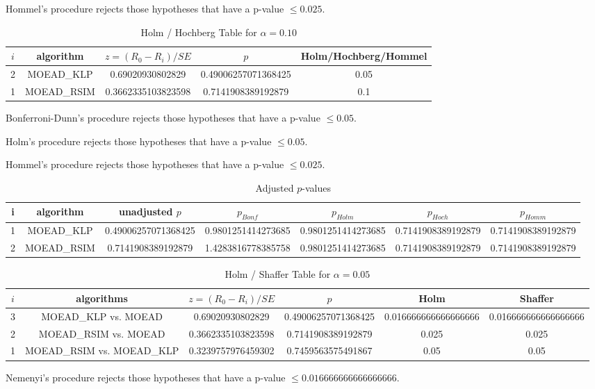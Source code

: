\documentclass[a4paper,10pt]{article}
\begin{document}
\begin{landscape}
Hommel's procedure rejects those hypotheses that have a p-value $\le0.025$.


\begin{table}[!htp]
\centering\tiny
\caption{Holm / Hochberg Table for $\alpha=0.10$}
\begin{tabular}{ccccc}
$i$&algorithm&$z=(R_0 - R_i)/SE$&$p$&Holm/Hochberg/Hommel\\
\hline
2&MOEAD_KLP&0.69020930802829&0.49006257071368425&0.05\\
1&MOEAD_RSIM&0.3662335103823598&0.7141908389192879&0.1\\
\hline
\end{tabular}
\end{table}
Bonferroni-Dunn's procedure rejects those hypotheses that have a p-value $\le0.05$.


Holm's procedure rejects those hypotheses that have a p-value $\le0.05$.


Hommel's procedure rejects those hypotheses that have a p-value $\le0.025$.


\begin{table}[!htp]
\centering\tiny
\caption{Adjusted $p$-values}
\begin{tabular}{ccccccc}
i&algorithm&unadjusted $p$&$p_{Bonf}$&$p_{Holm}$&$p_{Hoch}$&$p_{Homm}$\\
\hline
1&MOEAD_KLP&0.49006257071368425&0.9801251414273685&0.9801251414273685&0.7141908389192879&0.7141908389192879\\
2&MOEAD_RSIM&0.7141908389192879&1.4283816778385758&0.9801251414273685&0.7141908389192879&0.7141908389192879\\
\hline
\end{tabular}
\end{table}

\begin{table}[!htp]
\centering\tiny
\caption{Holm / Shaffer Table for $\alpha=0.05$}
\begin{tabular}{cccccc}
$i$&algorithms&$z=(R_0 - R_i)/SE$&$p$&Holm&Shaffer\\
\hline
3&MOEAD_KLP vs. MOEAD&0.69020930802829&0.49006257071368425&0.016666666666666666&0.016666666666666666\\
2&MOEAD_RSIM vs. MOEAD&0.3662335103823598&0.7141908389192879&0.025&0.025\\
1&MOEAD_RSIM vs. MOEAD_KLP&0.3239757976459302&0.7459563575491867&0.05&0.05\\
\hline
\end{tabular}
\end{table}
Nemenyi's procedure rejects those hypotheses that have a p-value $\le0.016666666666666666$.



\end{landscape}
\end{document}
